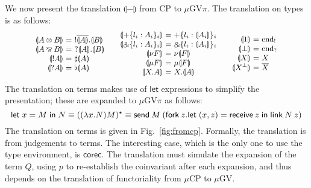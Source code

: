 \documentclass[orivec,envcountsame]{llncs}
\makeatletter
\newcommand{\with}{\mathbin\binampersand}
\newcommand{\parr}{\mathbin\bindnasrepma}
\newcommand{\cpdual}[1]{#1^\perp}
\newcommand{\cpbang}[1]{{! #1}}
\newcommand{\cpquery}[1]{{? #1}}
\newcommand{\gvdual}[1]{\overline{#1}}
\newcommand{\gvout}[2]{{!#1.#2}}
\newcommand{\gvin}[2]{{?#1.#2}}
\newcommand{\outterm}{\mathrm{end}_!}
\newcommand{\interm}{\mathrm{end}_?}
\newcommand{\gvserver}[1]{\flat #1}
\newcommand{\gvservice}[1]{\sharp #1}
\newcommand{\mapname}{\mathsf{map}}
\newcommand{\map}[3]{\mapname^{#1}_{#2}(#3)}
\newcommand{\gvmap}[3]{\mapname^{#1}_{#2}\:#3}
\newcommand{\mkwd}[1]{\mathsf{#1}}
\newcommand{\gvsend}[2]{\mkwd{send}\:#1\:#2}
\newcommand{\gvreceive}[1]{\mkwd{receive}\:#1}
\newcommand{\gvlet}[3]{\mkwd{let}\;#1 = #2\;\mkwd{in}\;#3}
\newcommand{\gvlink}[2]{\mkwd{link}\:#1\:#2}
\newcommand{\gvfork}[2]{\mkwd{fork}\:#1.#2}
\newcommand{\gvreceivek}[4]{\gvlet{({#1}, {#2})}{\gvreceive{#3}}{#4}}
\newcommand{\key}{\mkwd}
\newcommand{\togv}[1]{\llparenthesis #1 \rrparenthesis}
\newcommand{\topi}[1]{({#1})^\star}
\newcommand{\mucp}{$\mu\mathrm{CP}$\xspace}
\newcommand{\mugv}{$\mu\mathrm{GV}$\xspace}
\newcommand{\gvpi}{$\mu\mathrm{GV}\pi$\xspace}
\newcommand{\ba}{\begin{array}}
\newcommand{\ea}{\end{array}}
\newenvironment{eqs}{\ba{@{}r@{~}c@{~}l@{}}}{\ea}
\makeatother
\begin{document}
We now present the translation $\togv{-}$ from CP to \gvpi. The translation on types is as follows:
\[\small
\ba{@{}c@{\qquad}c@{\qquad}c@{}}
\begin{eqs}
\togv{A \otimes B} &=& \gvout{\gvdual{\togv{A}}}{\togv{B}} \\
\togv{A \parr B}   &=& \gvin{\togv{A}}{\togv{B}} \\
\togv{\cpbang{A}}   &=& \gvservice{\togv{A}} \\
\togv{\cpquery{A}}  &=& \gvserver{\togv{A}} \\
\end{eqs}
&
\begin{eqs}
\togv{+\{l_i:A_i\}_i}     &=& +\{l_i:\togv{A_i}\}_i  \\
\togv{\with\{l_i:A_i\}_i} &=& \with\{l_i:\togv{A_i}\}_i \\
\togv{\nu F} &=& \nu \togv{F} \\
\togv{\mu F} &=& \mu \togv{F} \\
\togv{X.A} &=& X.\togv{A} \\
\end{eqs}
&
\begin{eqs}
\togv{1}           &=& \outterm \\
\togv{\bot}              &=& \interm \\
\togv{X}            &=& X \\
\togv{\cpdual{X}}   &=& \gvdual{X} \\
\end{eqs}
\ea
\]
The translation on terms makes use of $\key{let}$ expressions to simplify the presentation; these
are expanded to \gvpi as follows:
\[\small
\gvlet{x}{M}{N} \equiv
  \topi{(\lambda x.N) M} \equiv
  \gvsend{M}{(\gvfork{z}{\gvreceivek{x}{z}{z}{\gvlink{N}{z}}})}
\]%
The translation on terms is given in Fig.~\ref{fig:fromcp}.  Formally, the translation is from
judgements to terms. The interesting case, which is the only one to use the type environment, is
$\key{corec}$.  The translation must simulate the expansion of the term $Q$, using $p$ to
re-establish the coinvariant after each expansion, and thus depends on the translation of
functoriality from \mucp to \mugv.


\end{document}
